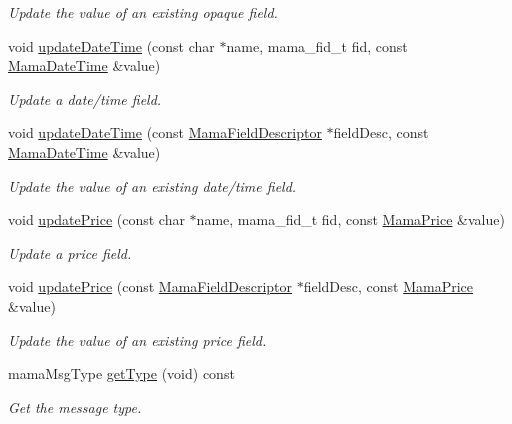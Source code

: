 \begin{DoxyCompactItemize}
\begin{DoxyCompactList}\small\item\em Update the value of an existing opaque field. \item\end{DoxyCompactList}\item 
void \hyperlink{classWombat_1_1MamaMsg_a11816449485c0d340ab253c017dd9648}{updateDateTime} (const char $\ast$name, mama\_\-fid\_\-t fid, const \hyperlink{classWombat_1_1MamaDateTime}{MamaDateTime} \&value)
\begin{DoxyCompactList}\small\item\em Update a date/time field. \item\end{DoxyCompactList}\item 
void \hyperlink{classWombat_1_1MamaMsg_a4c15e9fcf0ae8960d31c1af2b536aab2}{updateDateTime} (const \hyperlink{classWombat_1_1MamaFieldDescriptor}{MamaFieldDescriptor} $\ast$fieldDesc, const \hyperlink{classWombat_1_1MamaDateTime}{MamaDateTime} \&value)
\begin{DoxyCompactList}\small\item\em Update the value of an existing date/time field. \item\end{DoxyCompactList}\item 
void \hyperlink{classWombat_1_1MamaMsg_a66f6fca3309a5b534404c616eb334219}{updatePrice} (const char $\ast$name, mama\_\-fid\_\-t fid, const \hyperlink{classWombat_1_1MamaPrice}{MamaPrice} \&value)
\begin{DoxyCompactList}\small\item\em Update a price field. \item\end{DoxyCompactList}\item 
void \hyperlink{classWombat_1_1MamaMsg_a58735cb8ee0a928d6196aa1806f63371}{updatePrice} (const \hyperlink{classWombat_1_1MamaFieldDescriptor}{MamaFieldDescriptor} $\ast$fieldDesc, const \hyperlink{classWombat_1_1MamaPrice}{MamaPrice} \&value)
\begin{DoxyCompactList}\small\item\em Update the value of an existing price field. \item\end{DoxyCompactList}\item 
mamaMsgType \hyperlink{classWombat_1_1MamaMsg_a43f54147c0a703c4703a01fd959511d4}{getType} (void) const 
\begin{DoxyCompactList}\small\item\em Get the message type. \item\end{DoxyCompactList}\item 

\end{DoxyCompactItemize}
